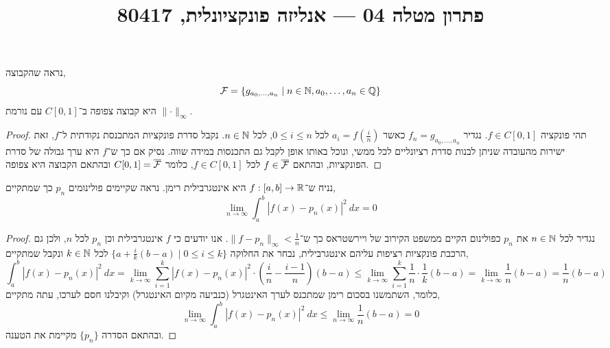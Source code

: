
\title{פתרון מטלה 04 --- אנליזה פונקציונלית, 80417}


\maketitle
\maketitleprint{}

\question{}
נראה שהקבוצה,
\[
	\mathcal{F} = \{ g_{a_0, \ldots, a_n} \mid n \in \mathbb{N}, a_0, \ldots, a_n \in \mathbb{Q} \}
\]
היא קבוצה צפופה ב־$C[0, 1]$ עם נורמת $\lVert \cdot \rVert_\infty$.
\begin{proof}
	תהי פונקציה $f \in C[0, 1]$.
	נגדיר $f_n = g_{a_0, \ldots, a_n}$ כאשר $a_i = f(\frac{i}{n})$ לכל $0 \le i \le n$, לכל $n \in \mathbb{N}$.
	נקבל סדרת פונקציות המתכנסת נקודתית ל־$f$, זאת ישירות מהעובדה שניתן לבנות סדרת רציונליים לכל ממשי, ונוכל באותו אופן לקבל גם התכנסות במידה שווה.
	נסיק אם כך ש־$f$ היא ערך גבולה של סדרת הפונקציות, ובהתאם $f \in \overline{\mathcal{F}}$ לכל $f \in C[0, 1]$, כלומר $C[0, 1] = \overline{\mathcal{F}}$ ובהתאם הקבוצה היא צפופה.
\end{proof}

\question{}
נניח ש־$f : [a, b] \to \mathbb{R}$ היא אינטגרבילית רימן.
נראה שקיימים פולינומים $p_n$ כך שמתקיים,
\[
	\lim_{n \to \infty} \int_{a}^{b} {|f(x) - p_n(x)|}^2\ dx = 0
\]
\begin{proof}
	נגדיר לכל $n \in \mathbb{N}$ את $p_n$ כפולינום הקיים ממשפט הקירוב של ויירשטראס כך ש־$\lVert f - p_n \rVert_\infty < \frac{1}{n}$.
	אנו יודעים כי $f$ אינטגרבילית וכן $p_n$ לכל $n$, ולכן גם הרכבת פונקציות רציפות עליהם אינטגרבילית, נבחר את החלוקה $\{ a + \frac{i}{k} (b - a) \mid 0 \le i \le k \}$ לכל $k \in \mathbb{N}$ ונקבל שמתקיים,
	\[
		\int_{a}^{b} {|f(x) - p_n(x)|}^2\ dx
		= \lim_{k \to \infty} \sum_{i = 1}^k {|f(x) - p_n(x)|}^2 \cdot (\frac{i}{n} - \frac{i - 1}{n}) (b - a)
		\le \lim_{k \to \infty} \sum_{i = 1}^k \frac{1}{n} \cdot \frac{1}{k} (b - a)
		= \lim_{k \to \infty} \frac{1}{n} (b - a)
		= \frac{1}{n} (b - a)
	\]
	כלומר, השתמשנו בסכום רימן שמתכנס לערך האינטגרל (כנביעה מקיום האינטגרל) וקיבלנו חסם לערכו, עתה מתקיים,
	\[
		\lim_{n \to \infty} \int_{a}^{b} {|f(x) - p_n(x)|}^2\ dx
		\le \lim_{n \to \infty} \frac{1}{n} (b - a)
		= 0
	\]
	ובהתאם הסדרה $\{ p_n \}$ מקיימת את הטענה.
\end{proof}

